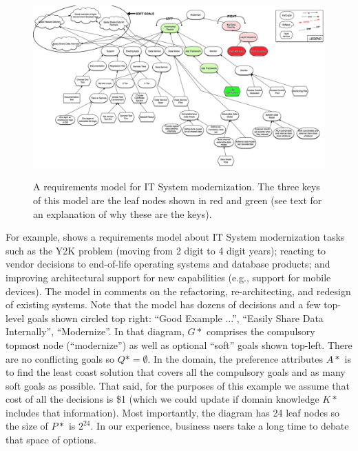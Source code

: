  \begin{figure}[!b]
 
   ~~~~~ \includegraphics[width=6in]{fig/AOWS_modified}
 

\caption{A requirements model for
   IT System modernization.    The three keys
of this model are the leaf nodes shown in red and green (see text for an explanation of why these are 
the keys). }
    \label{fig:aows}
\end{figure}For example,  
   shows a  requirements model about IT System modernization tasks such as 
the Y2K problem (moving from 2 digit to 4 digit years);  reacting to vendor decisions to end-of-life operating systems and database products; and
 improving architectural support for new capabilities (e.g.,
 support
for mobile devices).
The model in  comments on the refactoring, re-architecting, and  redesign  of
existing  systems. 
Note that the model has dozens of decisions and   a few top-level goals shown circled top right: ``Good Example ...'', ``Easily Share Data Internally'', ``Modernize''.   
In that diagram,  $G*$ comprises the compulsory
topmost node (``modernize'') as well as optional ``soft'' goals shown top-left. 
There are no conflicting
goals so $Q*=\emptyset$. In the domain, the  preference attributes $A*$ is to find the least coast solution
that covers all the compulsory goals and as many soft goals
as possible. That said, for the purposes of this example we assume that cost of all the decisions is \$1 (which we could update if domain knowledge $K*$ includes that information).
Most importantly, the diagram has 24 leaf nodes so the size of $P*$ is $2^{24}$.  In our
experience, business users take a long time to debate that space of options.



